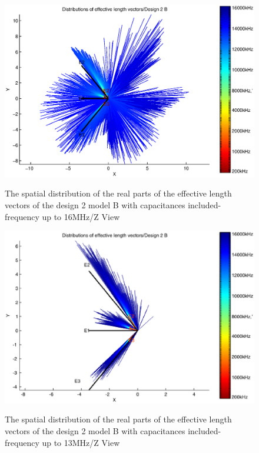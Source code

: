 \documentclass[a4paper,10pt]{thesis}
\begin{document}
\begin{figure}
\begin{center}
\includegraphics[scale=0.65]{HeffVerteilungD2-ZView_B_caps.eps} \\
\caption{The spatial distribution of the real parts of the effective length vectors of the design 2 model B with capacitances included-frequency up to 16MHz/Z View }\label{fig_heff_dist_D2_B_Z_View_caps}
\end{center}
\end{figure}

\begin{figure}
\begin{center}
\includegraphics[scale=0.65]{HeffVerteilungD2-ZView_B_caps2.eps} \\
\caption{The spatial distribution of the real parts of the effective length vectors of the design 2 model B with capacitances included-frequency up to 13MHz/Z View }\label{fig_heff_dist_D2_B_Z_View_caps2}
\end{center}
\end{figure}
\end{document}
